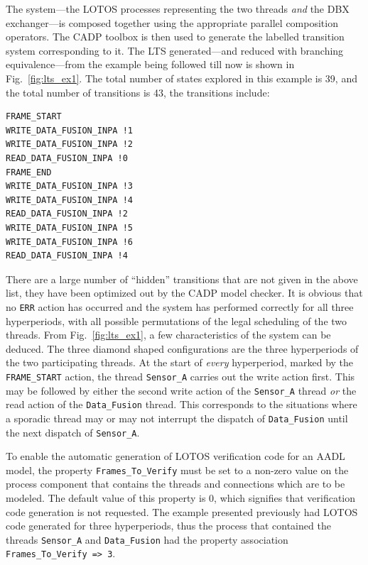 The system---the LOTOS processes representing the two threads
\emph{and} the DBX exchanger---is composed together using the
appropriate parallel composition operators. The CADP toolbox is then
used to generate the labelled transition system corresponding to
it. The LTS generated---and reduced with branching equivalence---from
the example being followed till now is shown in
Fig.~\ref{fig:lts_ex1}. The total number of states explored in this
example is 39, and the total number of transitions is 43, the
transitions include:

\begin{verbatim}
FRAME_START 
WRITE_DATA_FUSION_INPA !1 
WRITE_DATA_FUSION_INPA !2 
READ_DATA_FUSION_INPA !0 
FRAME_END 
WRITE_DATA_FUSION_INPA !3 
WRITE_DATA_FUSION_INPA !4 
READ_DATA_FUSION_INPA !2 
WRITE_DATA_FUSION_INPA !5 
WRITE_DATA_FUSION_INPA !6 
READ_DATA_FUSION_INPA !4 
\end{verbatim}

There are a large number of ``hidden'' transitions that are not given
in the above list, they have been optimized out by the CADP model
checker. It is obvious that no \texttt{ERR} action has occurred and
the system has performed correctly for all three hyperperiods, with
all possible permutations of the legal scheduling of the two
threads. From Fig.~\ref{fig:lts_ex1}, a few characteristics of the
system can be deduced. The three diamond shaped configurations are the
three hyperperiods of the two participating threads. At the start of
\emph{every} hyperperiod, marked by the \texttt{FRAME\_START} action,
the thread \texttt{Sensor\_A} carries out the write action first. This
may be followed by either the second write action of the
\texttt{Sensor\_A} thread \emph{or} the read action of the
\texttt{Data\_Fusion} thread. This corresponds to the situations where
a sporadic thread may or may not interrupt the dispatch of
\texttt{Data\_Fusion} until the next dispatch of \texttt{Sensor\_A}.

To enable the automatic generation of LOTOS verification code for an
AADL model, the property \texttt{Frames\_To\_Verify} must be set to a
non-zero value on the process component that contains the threads and
connections which are to be modeled. The default value of this
property is 0, which signifies that verification code generation is
not requested. The example presented previously had LOTOS code
generated for three hyperperiods, thus the process that contained the
threads \texttt{Sensor\_A} and \texttt{Data\_Fusion} had the property
association \texttt{Frames\_To\_Verify => 3}.

